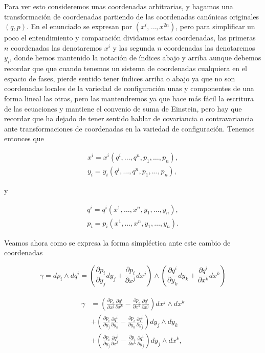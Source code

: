 \documentclass[a4paper,10pt]{article}
\numberwithin{equation}{section}
\begin{document}
Para ver esto consideremos unas coordenadas arbitrarias, y hagamos una transformación 
de coordenadas partiendo de las coordenadas canónicas originales $(q,p)$. En el enunciado 
se expresan por $(x^i,\dots,x^{2n})$, pero para simplificar un poco el entendimiento 
y comparación dividamos estas coordenadas, las primeras $n$ coordenadas las denotaremos 
$x^i$ y las segunda $n$ coordenadas las denotaremos $y_i$, donde hemos mantenido la notación 
de índices abajo y arriba aunque debemos recordar que que cuando tenemos un sistema 
de coordenadas cualquiera en el espacio de fases, pierde sentido tener índices arriba 
o abajo ya que no son coordenadas locales de la variedad de configuración unas 
y componentes de una forma lineal las otras, pero las mantendremos ya que hace más fácil 
la escritura de las ecuaciones y mantiene el convenio de suma de Einstein, pero 
hay que recordar que ha dejado de tener sentido hablar de covariancia o contravariancia 
ante transformaciones de coordenadas en la variedad de configuración. Tenemos entonces 
que 

\begin{align}
 x^i = x^i(q^i,\dots,q^n,p_1,\dots,p_n), \\
 y_i = y_i(q^i,\dots,q^n,p_1,\dots,p_n),
\end{align}

y 

\begin{align}
 q^i = q^i(x^1,\dots,x^n,y_1,\dots,y_n), \\
 p_i = p_i(x^1,\dots,x^n,y_1,\dots,y_n).
\end{align}

Veamos ahora como se expresa la forma simpléctica ante este cambio de coordenadas

\begin{equation}
 \gamma = dp_i \wedge dq^i = \left(\frac{\partial p_i}{\partial y_j}dy_j + 
 \frac{\partial p_i}{\partial x^j}dx^j\right) \wedge 
 \left(\frac{\partial q^i}{\partial y_k}dy_k + 
 \frac{\partial q^i}{\partial x^k}dx^k\right)
\end{equation}

\begin{align}
\begin{split}
 \gamma &= \left(\frac{\partial p_i}{\partial x^j}\frac{\partial q^i}{\partial x^k} 
 - \frac{\partial p_i}{\partial x^k}\frac{\partial q^i}{\partial x^j}\right)dx^j \wedge dx^k \\
 &+ \left(\frac{\partial p_i}{\partial y_j}\frac{\partial q^i}{\partial y_k} 
 - \frac{\partial p_i}{\partial y_k}\frac{\partial q^i}{\partial y_j}\right)dy_j \wedge dy_k \\
 &+ \left(\frac{\partial p_i}{\partial y_j}\frac{\partial q^i}{\partial x^k} 
 - \frac{\partial p_i}{\partial x^k}\frac{\partial q^i}{\partial y_j}\right)dy_j \wedge dx^k,
\end{split}
\end{align}
\end{document}
